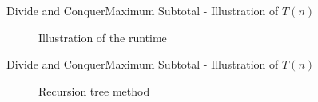

\begin{frame}{Divide and Conquer}{Maximum Subtotal - Illustration of $T(n)$}
  \begin{figure}
    \begin{adjustbox}{width=\linewidth}
      
    \end{adjustbox}
    \caption{Illustration of the runtime}
    \label{fig:divide_and_conquer:max_sub_array_runtime}
  \end{figure}
\end{frame}


\begin{frame}{Divide and Conquer}{Maximum Subtotal - Illustration of $T(n)$}
  \begin{figure}
    \begin{adjustbox}{width=\linewidth}
      
    \end{adjustbox}
    \caption{Recursion tree method}
    \label{fig:divide_and_conquer:max_sub_array_runtime_tree}
  \end{figure}
\end{frame}

